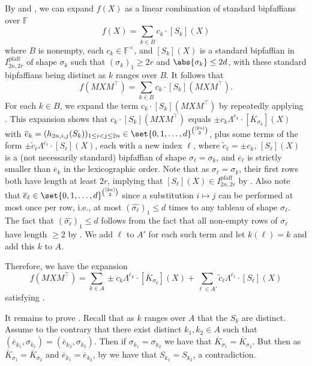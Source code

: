 \documentclass[10pt,a4paper]{amsart}
\newcommand*\ie{i.e.}
\DeclareMathOperator{\pfaff}{pfaff}
\newcommand*\F{\mathbb{F}}
\begin{document}
\begin{pf}
By  and , we can expand $f(X)$ as a linear combination of standard bipfaffians over $\F$
\[
    f(X) = \sum_{k\in B} c_k \cdot [S_k](X)
\]
where $B$ is nonempty, each $c_k \in \F^\times$, and $[S_k](X)$ is a standard bipfaffian in $I^{\pfaff}_{2n, 2r}$ of shape $\sigma_k$ such that $(\sigma_k)_1 \geq 2r$ and $\abs{\sigma_k} \leq 2d$, with these standard bipfaffians being distinct as $k$ ranges over $B$.
It follows that 
\[
    f(MXM^\top) = \sum_{k\in B} c_k \cdot [S_k](MXM^\top).
\]
For each $k \in B$, we expand the term $c_k \cdot [S_k](MXM^\top)$ by repeatedly applying .
This expansion shows that $c_k \cdot [S_k](MXM^\top)$ equals $\pm c_k \Lambda^{\overline{e}_k}\cdot [\overline{K}_{\sigma_k}](X)$ with $\overline{e}_k=(h_{2n, i, j}(S_k))_{1\leq i < j \leq 2n} \in \set{0,1,\dots,d}^{\binom{[2n]}{2}}$, plus some terms of the form $\pm \widetilde{c}_{\ell}\Lambda^{\overline{e}_\ell}\cdot [S_\ell](X)$, each with a new index $\ell$, where $\widetilde{c}_{\ell}=\pm c_k$, $[S_\ell](X)$ is a (not necessarily standard) bipfaffian of shape $\sigma_\ell = \sigma_k$, and $\overline{e}_\ell$ is strictly smaller than $\overline{e}_k$ in the lexicographic order.
Note that as $\sigma_\ell=\sigma_k$, their first rows both have length at least $2r$, implying that $[S_\ell](X) \in I^{\pfaff}_{2n, 2r}$ by .
Also note that $\overline{e}_\ell \in \set{0, 1, \dots, d}^{\binom{[2n]}{2}}$ since a substitution $i \mapsto j$ can be performed at most once per row, \ie, at most $(\widehat{\sigma_\ell})_1 \leq d$ times to any tableau of shape $\sigma_\ell$.
The fact that $(\widehat{\sigma_\ell})_1 \leq d$ follows from the fact that all non-empty rows of $\sigma_\ell$ have length $\geq 2$ by .
We add $\ell$ to $A'$ for each such term and let $k(\ell) = k$ and add this $k$ to $A$.

Therefore, we have the expansion
\[
    f(MXM^\top) = \sum_{k \in A} \pm{c}_{k} \Lambda^{\overline{e}_k}\cdot [\overline{K}_{\sigma_k}](X) + \sum_{\ell\in A'} \widetilde{c}_{\ell} \Lambda^{\overline{e}_\ell}\cdot [S_\ell](X)
\]
satisfying .

It remains to prove .
Recall that as $k$ ranges over $A$ that the $S_k$ are distinct.
Assume to the contrary that there exist distinct $k_1, k_2\in A$ such that $(\overline{e}_{k_1},\sigma_{k_1})=(\overline{e}_{k_2},\sigma_{k_2})$.
Then if $\sigma_{k_1} = \sigma_{k_2}$ we have that $\overline{K}_{\sigma_1} = \overline{K}_{\sigma_2}$.
But then as $\overline{K}_{\sigma_1} = \overline{K}_{\sigma_2}$ and $\overline{e}_{k_1} = \overline{e}_{k_2}$, by  we have that $S_{k_1} = S_{k_2}$, a contradiction.
\end{pf}
\end{document}
